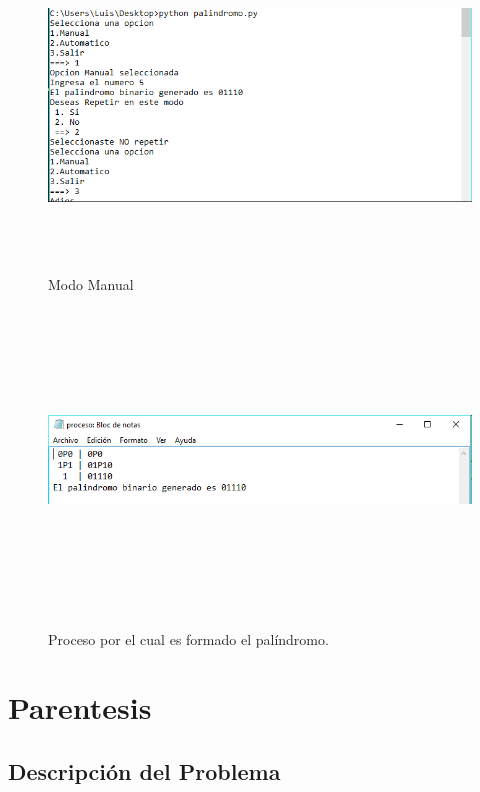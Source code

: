 \documentclass[12pt]{article}
\begin{document}
\begin{figure}[H]
\begin{center}
\includegraphics[width=\textwidth, height=8cm]{manual_palindromo}
\label{ }
\caption{Modo Manual}
\end{center}
\end{figure}

\begin{figure}[H]
\begin{center}
\includegraphics[width=\textwidth, height=8cm]{manual_palindromo_proceso}
\label{ }
\caption{Proceso por el cual es formado el palíndromo.}
\end{center}
\end{figure}

\newpage
\section{Parentesis}
\subsection{Descripción del Problema}
\end{document}
